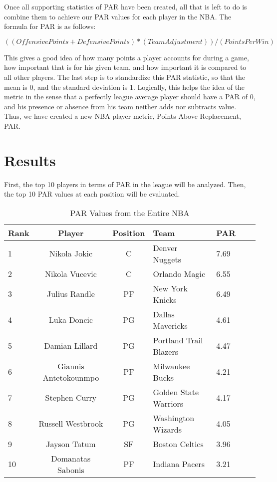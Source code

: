 \documentclass[12pt]{article}
\begin{document}
Once all supporting statistics of PAR have been created, all that is left to do is combine them to achieve our PAR values for each player in the NBA. The formula for PAR is as follows:

\begin{equation}
((Offensive Points + DefensivePoints) * (Team Adjustment))/(Points Per Win)
\end{equation}

This gives a good idea of how many points a player accounts for during a game, how important that is for 
his given team, and how important it is compared to all other players. The last step is to standardize this 
PAR statistic, so that the mean is 0, and the standard deviation is 1. Logically, this helps the idea of the 
metric in the sense that a perfectly league average player should have a PAR of 0, and his presence or 
absence from his team neither adds nor subtracts value. Thus, we have created a new NBA player metric, 
Points Above Replacement, PAR.
 
 
\section{Results}
First, the top 10 players in terms of PAR in the league will be analyzed. Then, the top 10 PAR values at each position will be evaluated.

\begin{table}[tbp]
  \caption{PAR Values from the Entire NBA}
  \label{tab:NBAtable}
\centering
\begin{tabular}[t]{lccllll}
  \toprule
  Rank & Player & Position & Team & PAR\\
  \midrule
 1 & Nikola Jokic & C & Denver Nuggets & 7.69\\
  \midrule
 2 & Nikola Vucevic & C & Orlando Magic & 6.55\\
  \midrule
 3 & Julius Randle & PF & New York Knicks & 6.49\\
  \midrule
 4 & Luka Doncic & PG & Dallas Mavericks & 4.61\\
  \midrule
 5 & Damian Lillard & PG & Portland Trail Blazers & 4.47\\
  \midrule
 6 & Giannis Antetokounmpo & PF & Milwaukee Bucks & 4.21\\
  \midrule
 7 & Stephen Curry & PG & Golden State Warriors & 4.17\\
  \midrule
 8 & Russell Westbrook & PG & Washington Wizards & 4.05\\
  \midrule
 9 & Jayson Tatum & SF & Boston Celtics & 3.96\\
  \midrule
 10 & Domanatas Sabonis & PF & Indiana Pacers & 3.21\\
  \bottomrule
\end{tabular}
\end{table}
\end{document}
